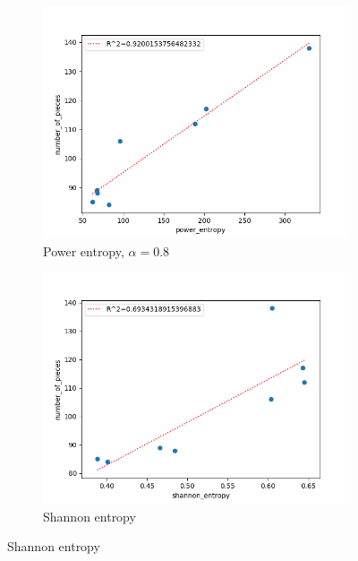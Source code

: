 \documentclass{mgggarticle}
\begin{document}
\begin{figure}
\begin{subfigure}{0.4\textwidth}
\centering
\includegraphics[width=\textwidth]{scatters/pent.png}
\caption{Power entropy, $\alpha = 0.8$}
\end{subfigure}
\begin{subfigure}{0.4\textwidth}
\centering
\includegraphics[width=\textwidth]{scatters/shent.png}
\caption{Shannon entropy}
\end{subfigure}


\end{figure}
\end{document}

